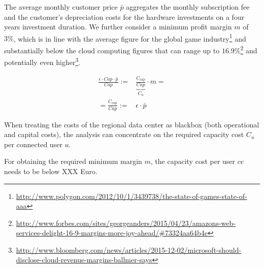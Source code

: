 The average monthly customer price $\bar{p}$ aggregates the monthly subscription fee and the customer's depreciation costs for the hardware investments on a four years investment duration. We further consider a minimum profit margin $m$ of $3 \%$, which is in line with the average figure for the global game industry\footnote{\url{http://www.polygon.com/2012/10/1/3439738/the-state-of-games-state-of-aaa}} and substantially below the cloud computing figures that can range up to $16.9\%$\footnote{\url{http://www.forbes.com/sites/georgeanders/2015/04/23/amazons-web-services-delight-16-9-margins-more-joy-ahead/\#73324aa64b4e}} and potentially even higher\footnote{\url{http://www.bloomberg.com/news/articles/2015-12-02/microsoft-should-disclose-cloud-revenue-margins-ballmer-says}}.


\begin{align} \label{eq:computational_efficiency}
	\frac{\epsilon \cdot Cap \cdot \bar{p}}{Cap} :=& \underbrace{\frac{C_{cap}}{Cap}}_{C_{u}} \cdot m =\\
	=\frac{C_{cap}}{Cap} :=& \epsilon \cdot \bar{p}
\end{align}

When treating the costs of the regional data center as blackbox (both operational and capital costs), the analysis can concentrate on the required capacity cost $C_{u}$ per connected user $u$.


For obtaining the required minimum margin $m$, the capacity cost per user $ce$ needs to be below XXX Euro.


